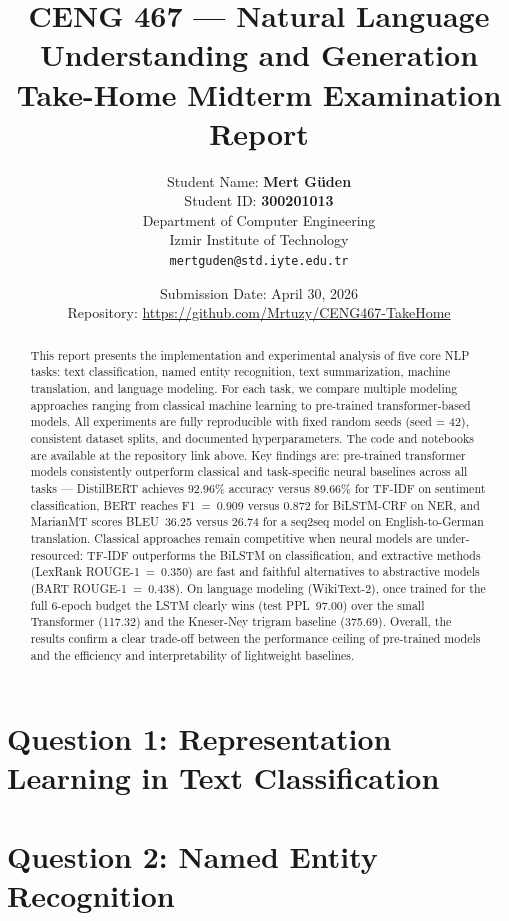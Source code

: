\documentclass[12pt, a4paper]{article}
\title{
    \Large \textbf{CENG 467 — Natural Language Understanding and Generation}\\[0.5em]
    \large Take-Home Midterm Examination Report
}
\author{
    Student Name: \textbf{Mert Güden}\\
    Student ID: \textbf{300201013}\\[0.3em]
    Department of Computer Engineering\\
    Izmir Institute of Technology\\[0.3em]
    \texttt{mertguden@std.iyte.edu.tr}
}
\date{
    Submission Date: April 30, 2026\\[0.3em]
    Repository: \url{https://github.com/Mrtuzy/CENG467-TakeHome}
}
\begin{document}
\maketitle
\thispagestyle{empty}

\begin{abstract}
This report presents the implementation and experimental analysis of five core NLP tasks:
text classification, named entity recognition, text summarization, machine translation, and
language modeling. For each task, we compare multiple modeling approaches ranging from
classical machine learning to pre-trained transformer-based models. All experiments are
fully reproducible with fixed random seeds (seed = 42), consistent dataset splits, and
documented hyperparameters. The code and notebooks are available at the repository link
above. Key findings are: pre-trained transformer models consistently outperform classical and task-specific neural baselines across all tasks — DistilBERT achieves 92.96\% accuracy versus 89.66\% for TF-IDF on sentiment classification, BERT reaches F1~=~0.909 versus 0.872 for BiLSTM-CRF on NER, and MarianMT scores BLEU~36.25 versus 26.74 for a seq2seq model on English-to-German translation. Classical approaches remain competitive when neural models are under-resourced: TF-IDF outperforms the BiLSTM on classification, and extractive methods (LexRank ROUGE-1~=~0.350) are fast and faithful alternatives to abstractive models (BART ROUGE-1~=~0.438). On language modeling (WikiText-2), once trained for the full 6-epoch budget the LSTM clearly wins (test PPL~97.00) over the small Transformer (117.32) and the Kneser-Ney trigram baseline (375.69). Overall, the results confirm a clear trade-off between the performance ceiling of pre-trained models and the efficiency and interpretability of lightweight baselines.
\end{abstract}

\newpage
\tableofcontents
\newpage

\section{Question 1: Representation Learning in Text Classification}


\newpage
\section{Question 2: Named Entity Recognition}

\end{document}
